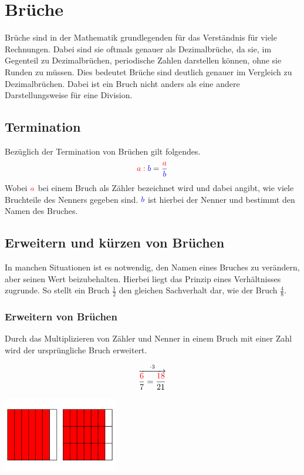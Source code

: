 \section{Brüche} Brüche sind in der Mathematik grundlegenden für das Verständnis für viele Rechnungen. Dabei sind sie oftmals genauer als Dezimalbrüche, da sie, im Gegenteil zu Dezimalbrüchen, periodische Zahlen darstellen können, ohne sie Runden zu müssen. Dies bedeutet Brüche sind deutlich genauer im Vergleich zu Dezimalbrüchen. Dabei ist ein Bruch nicht anders als eine andere Darstellungsweise für eine Division.
\subsection{Termination} Bezüglich der Termination von Brüchen gilt folgendes.\\
\[\color{red}a:\color{blue}b\color{black}= \frac{\color{red}a}{\color{blue}b}\]
Wobei $\color{red}{a}$ bei einem Bruch als Zähler bezeichnet wird und dabei angibt, wie viele Bruchteile des Nenners gegeben sind.  $\color{blue}{b}$ ist hierbei der Nenner und bestimmt den Namen des Bruches.
\subsection{Erweitern und kürzen von Brüchen}
In manchen Situationen ist es notwendig, den Namen eines Bruches zu verändern, aber seinen Wert beizubehalten. Hierbei liegt das Prinzip eines Verhältnisses zugrunde. So stellt ein Bruch $\frac{1}{2}$ den gleichen Sachverhalt dar, wie der Bruch $\frac{4}{8}$.
\subsubsection{Erweitern von Brüchen} Durch das Multiplizieren von Zähler und Nenner in einem Bruch mit einer Zahl wird der ursprüngliche Bruch erweitert. 
\begin{paracol}{2}
	\begin{flushleft}
	\begin{beispiel}
\[\overset{\cdot3}{\overrightarrow{\frac{\color{red}6}{7}=\frac{\color{red}18}{21}}}\]
	\end{beispiel}
	\end{flushleft}	
\switchcolumn
	\begin{flushright}
		\includegraphics[width=5cm]{Media/Theorieheft-Brueche-Erweitern.png}
	\end{flushright}
\end{paracol}
